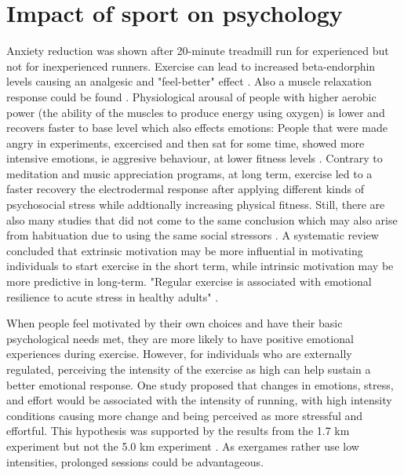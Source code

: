 \section{Impact of sport on psychology}
Anxiety reduction was shown after 20-minute treadmill run for experienced but not for inexperienced runners. \cite{hatfield87psychophysiology, boutcher86anxiety}
Exercise can lead to increased beta-endorphin levels causing an analgesic and "feel-better" effect \cite{hatfield87psychophysiology}. Also a muscle relaxation response could be found \cite{devries72electromyiographic, hatfield87psychophysiology}.
Physiological arousal of people with higher aerobic power (the ability of the muscles to produce energy using oxygen) is lower and recovers faster to base level which also effects emotions: People that were made angry in experiments, excercised and then sat for some time, showed more intensive emotions, ie aggresive behaviour, at lower fitness levels \cite{zillmann74attribution}.
Contrary to meditation and music appreciation programs, at long term, exercise led to a faster recovery the electrodermal response after applying different kinds of psychosocial stress \cite{keller84physical} while addtionally increasing physical fitness. Still, there are also many studies that did not come to the same conclusion which may also arise from habituation due to using the same social stressors \cite{hatfield87psychophysiology}.
A systematic review concluded that extrinsic motivation may be more influential in motivating individuals to start exercise in the short term, while intrinsic motivation may be more predictive in long-term.\cite{teixeira2012exercise} 
"Regular exercise is associated with emotional resilience to acute stress in healthy adults" \cite{childs15regular}.

When people feel motivated by their own choices and have their basic psychological needs met, they are more likely to have positive emotional experiences during exercise. However, for individuals who are externally regulated, perceiving the intensity of the exercise as high can help sustain a better emotional response. \cite{teixeira16needs}
One study proposed that changes in emotions, stress, and effort would be associated with the intensity of running, with high intensity conditions causing more change and being perceived as more stressful and effortful. This hypothesis was supported by the results from the 1.7 km experiment but not the 5.0 km experiment \cite{kerr2000effects}. As exergames rather use low intensities, prolonged sessions could be advantageous. 

